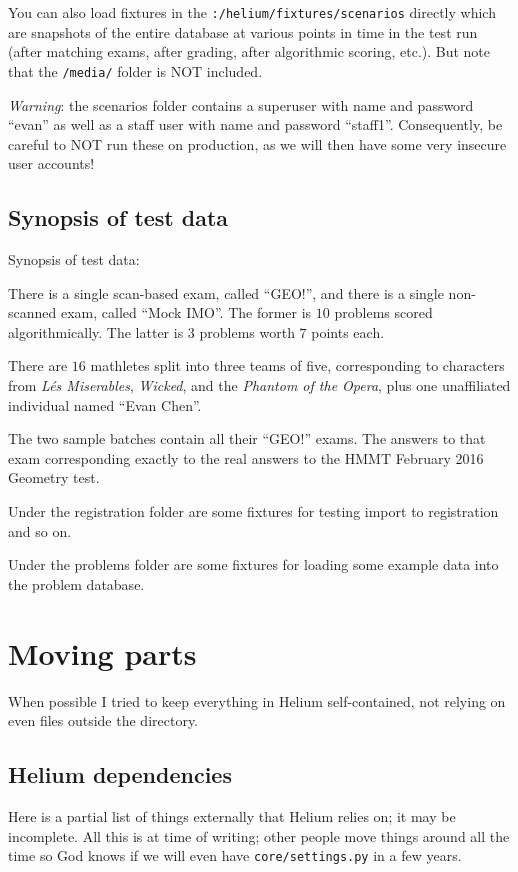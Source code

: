 You can also load fixtures in the \verb+:/helium/fixtures/scenarios+ directly
which are snapshots of the entire database at various points in time
in the test run
(after matching exams, after grading, after algorithmic scoring, etc.).
But note that the \verb+/media/+ folder is NOT included.

\emph{Warning}: the scenarios folder contains a superuser
with name and password ``evan''
as well as a staff user with name and password ``staff1''.
Consequently, be careful to NOT run these on production,
as we will then have some very insecure user accounts!

\subsection{Synopsis of test data}
Synopsis of test data:

\begin{itemize}
\ii There is a single scan-based exam, called ``GEO!'',
and there is a single non-scanned exam, called ``Mock IMO''.
The former is $10$ problems scored algorithmically.
The latter is $3$ problems worth $7$ points each.

\ii There are $16$ mathletes split into three teams of five,
corresponding to characters from \emph{L\'es Miserables},
\emph{Wicked}, and the \emph{Phantom of the Opera},
plus one unaffiliated individual named ``Evan Chen''.

\ii The two sample batches contain all their ``GEO!'' exams.
The answers to that exam corresponding exactly to the real answers
to the HMMT February 2016 Geometry test.

\ii Under the registration folder are some fixtures for testing
import to registration and so on.

\ii Under the problems folder are some fixtures for loading
some example data into the problem database.
\end{itemize}

\section{Moving parts}
When possible I tried to keep everything in Helium 
self-contained, not relying on even files outside the directory.

\subsection{Helium dependencies}
Here is a partial list of things externally that Helium relies on;
it may be incomplete.
All this is at time of writing;
other people move things around all the time so God knows
if we will even have \texttt{core/settings.py} in a few years.


